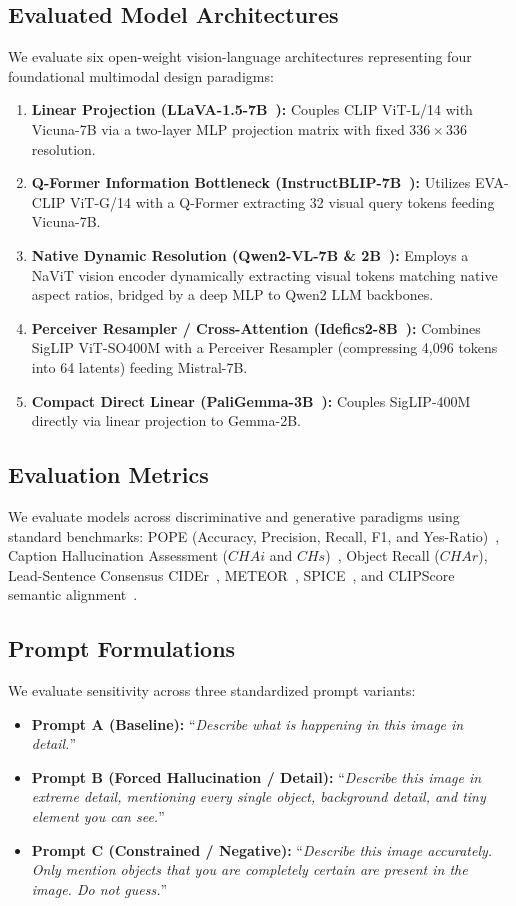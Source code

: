 \documentclass[conference]{IEEEtran}
\begin{document}
\subsection{Evaluated Model Architectures}
We evaluate six open-weight vision-language architectures representing four foundational multimodal design paradigms:
\begin{enumerate}
    \item \textbf{Linear Projection (LLaVA-1.5-7B~\cite{liu2023llava}):} Couples CLIP ViT-L/14 with Vicuna-7B via a two-layer MLP projection matrix with fixed $336 \times 336$ resolution.
    \item \textbf{Q-Former Information Bottleneck (InstructBLIP-7B~\cite{dai2023instructblip}):} Utilizes EVA-CLIP ViT-G/14 with a Q-Former extracting 32 visual query tokens feeding Vicuna-7B.
    \item \textbf{Native Dynamic Resolution (Qwen2-VL-7B \& 2B~\cite{wang2024qwen2vl}):} Employs a NaViT vision encoder dynamically extracting visual tokens matching native aspect ratios, bridged by a deep MLP to Qwen2 LLM backbones.
    \item \textbf{Perceiver Resampler / Cross-Attention (Idefics2-8B~\cite{laurencon2024obelics}):} Combines SigLIP ViT-SO400M with a Perceiver Resampler (compressing 4,096 tokens into 64 latents) feeding Mistral-7B.
    \item \textbf{Compact Direct Linear (PaliGemma-3B~\cite{beyer2024paligemma}):} Couples SigLIP-400M directly via linear projection to Gemma-2B.
\end{enumerate}

\subsection{Evaluation Metrics}
We evaluate models across discriminative and generative paradigms using standard benchmarks: POPE (Accuracy, Precision, Recall, F1, and Yes-Ratio)~\cite{li2023evaluating}, Caption Hallucination Assessment ($CHAi$ and $CHs$)~\cite{rohrbach2018chair}, Object Recall ($CHAr$), Lead-Sentence Consensus CIDEr~\cite{vedantam2015cider}, METEOR~\cite{denkowski2014meteor}, SPICE~\cite{anderson2016spice}, and CLIPScore semantic alignment~\cite{hessel2021clipscore}.

\subsection{Prompt Formulations}
We evaluate sensitivity across three standardized prompt variants:
\begin{itemize}
    \item \textbf{Prompt A (Baseline):} ``\textit{Describe what is happening in this image in detail.}''
    \item \textbf{Prompt B (Forced Hallucination / Detail):} ``\textit{Describe this image in extreme detail, mentioning every single object, background detail, and tiny element you can see.}''
    \item \textbf{Prompt C (Constrained / Negative):} ``\textit{Describe this image accurately. Only mention objects that you are completely certain are present in the image. Do not guess.}''
\end{itemize}
\end{document}
